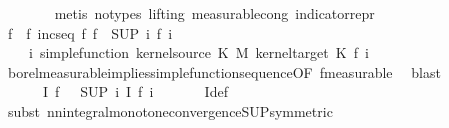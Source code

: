 \begin{isabellebody}
\ \ \ \ \ \ \isamarkupfalse%
\ {\isacharparenleft}{\kern0pt}metis\ {\isacharparenleft}{\kern0pt}no{\isacharunderscore}{\kern0pt}types{\isacharcomma}{\kern0pt}\ lifting{\isacharparenright}{\kern0pt}\ measurable{\isacharunderscore}{\kern0pt}cong\ indicator{\isacharunderscore}{\kern0pt}repr{\isacharparenright}{\kern0pt}\isanewline
\ \ \isamarkupfalse%
\isanewline
\ \ \isamarkupfalse%
\ f{\isacharprime}{\kern0pt}\ \ f{\isacharprime}{\kern0pt}{\isacharcolon}{\kern0pt}\ {\isachardoublequoteopen}incseq\ f{\isacharprime}{\kern0pt}{\isachardoublequoteclose}\ {\isachardoublequoteopen}f\ {\isacharequal}{\kern0pt}\ {\isacharparenleft}{\kern0pt}SUP\ i{\isachardot}{\kern0pt}\ f{\isacharprime}{\kern0pt}\ i{\isacharparenright}{\kern0pt}{\isachardoublequoteclose}\isanewline
\ \ \ \ {\isachardoublequoteopen}{\isasymAnd}i{\isachardot}{\kern0pt}\ simple{\isacharunderscore}{\kern0pt}function\ {\isacharparenleft}{\kern0pt}kernel{\isacharunderscore}{\kern0pt}source\ K\ {\isasymOtimes}\isactrlsub M\ kernel{\isacharunderscore}{\kern0pt}target\ K{\isacharparenright}{\kern0pt}\ {\isacharparenleft}{\kern0pt}f{\isacharprime}{\kern0pt}\ i{\isacharparenright}{\kern0pt}{\isachardoublequoteclose}\isanewline
\ \ \ \ \isamarkupfalse%
\ borel{\isacharunderscore}{\kern0pt}measurable{\isacharunderscore}{\kern0pt}implies{\isacharunderscore}{\kern0pt}simple{\isacharunderscore}{\kern0pt}function{\isacharunderscore}{\kern0pt}sequence{\isacharbrackleft}{\kern0pt}OF\ f{\isacharunderscore}{\kern0pt}measurable{\isacharbrackright}{\kern0pt}\ \isamarkupfalse%
\ blast\isanewline
\ \ \isamarkupfalse%
\ {\isachardoublequoteopen}{\isasymAnd}{\isasymomega}\ {\isasymomega}\ {\isasymin}\ {\isacharquery}{\kern0pt}{\isasymOmega}\ {\isasymLongrightarrow}\ I\ f\ {\isasymomega}\ {\isacharequal}{\kern0pt}\ {\isacharparenleft}{\kern0pt}SUP\ i{\isachardot}{\kern0pt}\ I\ {\isacharparenleft}{\kern0pt}f{\isacharprime}{\kern0pt}\ i{\isacharparenright}{\kern0pt}\ {\isasymomega}\isanewline
\ \ \ \ \isamarkupfalse%
\ I{\isacharunderscore}{\kern0pt}def\isanewline
\ \ \ \ \isamarkupfalse%
\ {\isacharparenleft}{\kern0pt}subst\ nn{\isacharunderscore}{\kern0pt}integral{\isacharunderscore}{\kern0pt}monotone{\isacharunderscore}{\kern0pt}convergence{\isacharunderscore}{\kern0pt}SUP{\isacharbrackleft}{\kern0pt}symmetric{\isacharbrackright}{\kern0pt}{\isacharparenright}{\kern0pt}\isanewline

\end{isabellebody}
